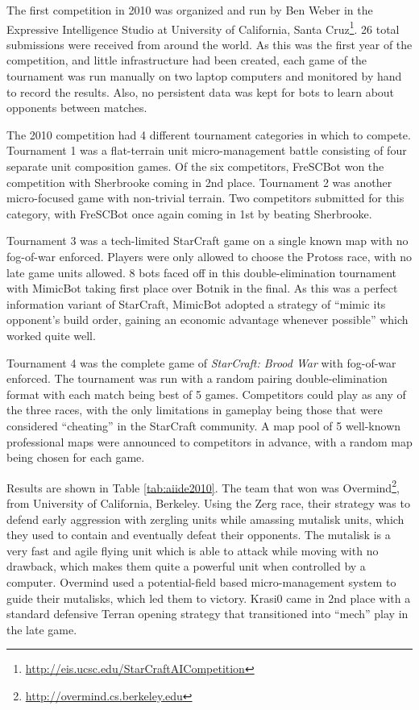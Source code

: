 \documentclass{llncs}
\begin{document}
The first competition in 2010 was organized and run by Ben Weber in the Expressive
Intelligence Studio at University of California, Santa Cruz\footnote{\url{http://eis.ucsc.edu/StarCraftAICompetition}}. 26 total submissions
were received from around the world. As this was the first year of the competition,
and little infrastructure had been created, each game of the tournament was run 
manually on two laptop computers and monitored by hand to record the results. Also,
no persistent data was kept for bots to learn about opponents between matches.

The 2010 competition had 4 different tournament categories in which to compete. Tournament 1
was a flat-terrain unit micro-management battle consisting of four separate unit
composition games. Of the six competitors, FreSCBot won the competition with
Sherbrooke coming in 2nd place. Tournament 2 was another micro-focused game with
non-trivial terrain. Two competitors submitted for this category, with FreSCBot
once again coming in 1st by beating Sherbrooke.

Tournament 3 was a tech-limited StarCraft game on a single known map with no fog-of-war enforced. Players
were only allowed to choose the Protoss race, with no late game units allowed. 8 bots
faced off in this double-elimination tournament with MimicBot taking first place over Botnik in the final.
As this was a perfect information variant of StarCraft, MimicBot adopted a strategy of
``mimic its opponent's build order, gaining an economic advantage whenever possible'' which
worked quite well.

Tournament 4 was the complete game of {\em StarCraft: Brood War} with fog-of-war enforced. The tournament
was run with a random pairing double-elimination format with each match being best of 5 games.
Competitors could play as any of the three races, with the only limitations in gameplay
being those that were considered ``cheating'' in the StarCraft community. A map pool of
5 well-known professional maps were announced to competitors in advance, with a random map being chosen for each game.

Results are shown in Table \ref{tab:aiide2010}. The team that won was Overmind\footnote{\url{http://overmind.cs.berkeley.edu}}, from University of California, Berkeley. Using the Zerg race, their
strategy was to defend early aggression with zergling units while amassing mutalisk units,
which they used to contain and eventually defeat their opponents. The mutalisk is a very fast and agile
flying unit which is able to attack while moving with no drawback, which makes them quite a powerful
unit when controlled by a computer. Overmind used a potential-field
based micro-management system to guide their mutalisks, which led them to victory. Krasi0 came in 2nd place
with a standard defensive Terran opening strategy that transitioned into ``mech'' play in the late game.
\end{document}
